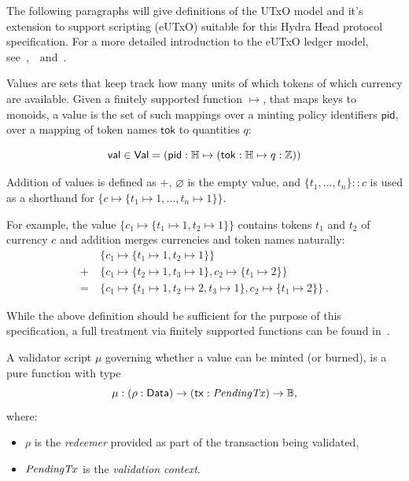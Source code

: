The following paragraphs will give definitions of the UTxO model and it's
extension to support scripting (eUTxO) suitable for this Hydra Head protocol
specification. For a more detailed introduction to the eUTxO ledger model,
see~\cite{eutxo},~\cite{eutxo-2}~and~\cite{utxo-ma}.

\begin{definition}[Values]
  Values are sets that keep track how many units of which tokens of which
  currency are available. Given a finitely supported function $\mapsto$, that
  maps keys to monoids, a value is the set of such mappings over a minting
  policy identifiers $\mathsf{pid}$, over a mapping of token names
  $\mathsf{tok}$ to quantities $q$:

  \[
    \mathsf{val} \in \mathsf{Val} = (\mathsf{pid} : \mathbb{H} \mapsto (\mathsf{tok} : \mathbb{H} \mapsto q : \mathbb{Z}))
  \]

  Addition of values is defined as $+$, $\varnothing$ is the empty value,
  and \(\{t_1, \ldots, t_n\} :: c\) is used as a shorthand for
  \(\{c \mapsto \{t_1 \mapsto 1, \ldots, t_n \mapsto 1\}\}\).
\end{definition}

For example, the value $\{c_{1} \mapsto \{t_1 \mapsto 1, t_2 \mapsto 1\}\}$
contains tokens $t_1$ and $t_2$ of currency $c$ and addition merges currencies
and token names naturally:
\begin{align*}
  & \{c_{1} \mapsto \{t_1 \mapsto 1, t_2 \mapsto 1\}\} \\
  + \ & \{c_{1} \mapsto \{t_{2} \mapsto 1, t_3 \mapsto 1\}, c_{2} \mapsto \{ t_{1} \mapsto 2\}\} \\
  = \ & \{c_{1} \mapsto \{t_1 \mapsto 1, t_2 \mapsto 2, t_3 \mapsto 1\}, c_{2} \mapsto \{ t_{1} \mapsto 2\}\} \ .
\end{align*}

While the above definition should be sufficient for the purpose of this
specification, a full treatment via finitely supported functions can be found
in~\cite{utxo-ma}.

\begin{definition}
  A validator script $\mu$ governing whether a value can be minted (or burned),
  is a pure function with type
  \[
    \mu : (\rho : \mathsf{Data}) \to (\mathsf{tx} : \mathit{PendingTx}) \to\mathbb{B},
  \]
  where:
  \begin{itemize}
    \item $\rho$ is the \emph{redeemer} provided as part of the transaction
          being validated,
    \item $\mathit{PendingTx}$ is the \emph{validation context}.
  \end{itemize}
\end{definition}

